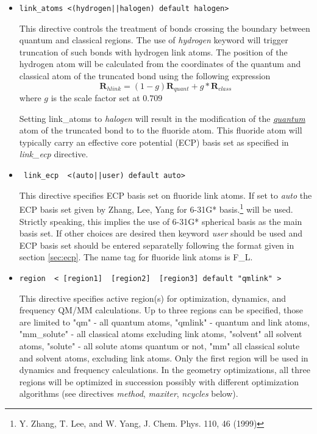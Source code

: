 \begin{itemize}
\item
\begin{verbatim}
link_atoms <(hydrogen||halogen) default halogen>
\end{verbatim}

This directive controls the treatment of bonds crossing the boundary between quantum and classical regions.
The use of {\it hydrogen } keyword will trigger truncation of such bonds with hydrogen link atoms. The position of the hydrogen
atom will be calculated from the coordinates of the quantum and classical atom of the truncated bond using the
following expression
\begin{displaymath}
\mathbf{R}_{hlink} = (1-g)\mathbf{R}_{quant} + g*\mathbf{R}_{class}
\end{displaymath}
where $g$ is the scale factor set at $0.709$

Setting link{\_}atoms to {\it halogen } will result in the modification of the {\it \underline{quantum}} 
atom of the truncated bond to 
to the fluoride atom. This fluoride atom will typically carry an effective core potential (ECP) basis set as specified
in {\it link{\_}ecp} directive.

\item
\begin{verbatim}
 link_ecp  <(auto||user) default auto> 
\end{verbatim}
This directive specifies ECP basis set on fluoride link atoms. If set to {\it auto } 
the ECP basis set given by Zhang, Lee, Yang for 6-31G* basis.\footnote{Y. Zhang, T. Lee, and W. Yang, J. Chem. Phys. 110, 46 (1999)} 
will be used. Strictly speaking, this implies the use of 6-31G* spherical basis as the main basis set. 
If other choices are desired then keyword {\it user } should be used and ECP basis set should be entered separatelly 
following the format given in
section \ref{sec:ecp}. 
The name tag for fluoride link atoms is F{\_}L. 

\item
\begin{verbatim}
region  < [region1]  [region2]  [region3] default "qmlink" >
\end{verbatim}

This directive specifies active region(s) for optimization, dynamics, and frequency QM/MM calculations.
Up to three regions can be specified, those are limited to "qm" - all quantum atoms, "qmlink" - quantum and link atoms,
"mm{\_}solute" - all classical atoms excluding link atoms, "solvent" all solvent atoms, "solute" - all solute atoms quantum or not,
"mm" all classical solute and solvent atoms, excluding link atoms.
Only the first region will be used in dynamics and frequency calculations. In the geometry optimizations, all three regions will
be optimized in succession possibly with different optimization algorithms (see directives {\it method},  {\it maxiter},
{\it ncycles} below).


\end{itemize}
